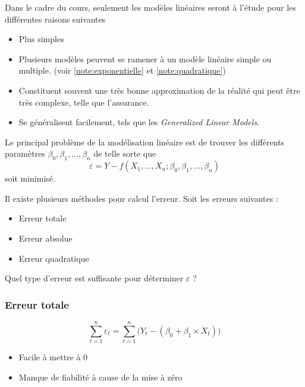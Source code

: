 \documentclass[11pt,french]{report}
\begin{document}
Dans le cadre du cours, seulement les modèles linéaires seront à l'étude pour les différentes raisons suivantes

\bigskip
\begin{itemize}
\item Plus simples
\item Plusieurs modèles peuvent se ramener à un modèle linéaire simple ou multiple. (voir \ref{note:exponentielle} et \ref{note:quadratique})
\item Constituent souvent une très bonne approximation de la réalité qui peut être très complexe, telle que l'assurance.
\item Se généralisent facilement, tels que les \textit{Generalized Linear Models}.
\end{itemize}
\bigskip

Le principal problème de la modélisation linéaire est de trouver les différents paramètres $\beta_0, \beta_1, ..., \beta_n$ de telle sorte que
\begin{equation}
\varepsilon = Y - f(X_1,...,X_n; \beta_0, \beta_1,...,\beta_n)
\end{equation}
soit minimisé.
\bigskip

Il existe plusieurs méthodes pour calcul l'erreur. Soit les erreurs suivantes :
\begin{itemize}
\item Erreur totale
\item Erreur absolue
\item Erreur quadratique
\end{itemize}
\bigskip

Quel type d'erreur est suffisante pour déterminer $\varepsilon$ ?

\subsubsection{Erreur totale}
\begin{equation}
\displaystyle\sum_{t=1}^n \varepsilon_t = \displaystyle\sum_{t=1}^n \Big( Y_t - (\beta_0 + \beta_1\times X_t) \Big) 
\end{equation}
\begin{itemize}
\item Facile à mettre à 0
\item Manque de fiabilité à cause de la mise à zéro
\end{itemize}
\end{document}
